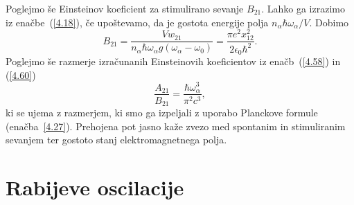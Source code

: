 Poglejmo še Einsteinov koeficient za stimulirano sevanje $B_{21}$. Lahko ga 
izrazimo iz enačbe~(\ref{4.18}), če upoštevamo, da je gostota energije 
polja $n_{\alpha}\hbar\omega_{\alpha}/V$. Dobimo
\begin{equation}
B_{21}=\frac{Vw_{21}}{n_{\alpha}\hbar\omega_{\alpha} g(\omega_{\alpha}-\omega_0)}
=\frac{\pi e^{2}x_{12}^{2}}{2\epsilon_{0}\hbar^{2}}.
\label{4.60}
\end{equation}
Poglejmo  še razmerje izračunanih Einsteinovih koeficientov iz enačb~(\ref{4.58}) in 
(\ref{4.60})
\begin{equation}
 \frac{A_{21}}{B_{21}}=\frac{\hbar \omega_\alpha^3}{\pi^2 c^3},
\end{equation}
ki se ujema z razmerjem, ki smo ga izpeljali z uporabo
Planckove formule (enačba~\ref{4.27}). Prehojena pot jasno kaže zvezo med spontanim in
stimuliranim sevanjem ter gostoto stanj elektromagnetnega polja. 

\section{Rabijeve oscilacije}